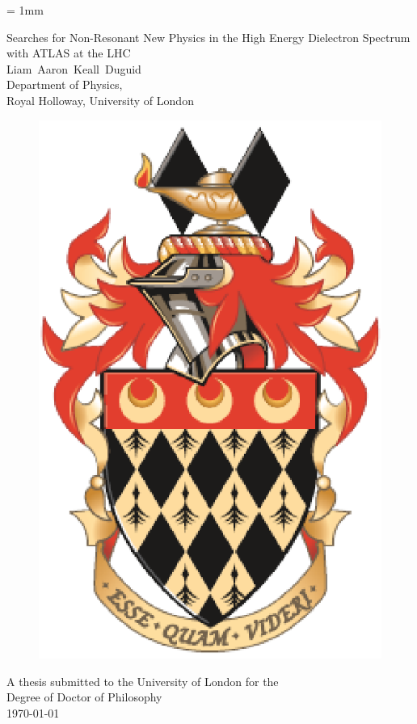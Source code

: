 \documentclass[12pt,a4paper]{report} %
\title{}
\author{}
\date{2014}
\begin{document}
\unitlength = 1mm
\begin{titlepage}

   \centering
   \vfill
   {\fontsize{0.75cm}{2cm}\selectfont Searches for Non-Resonant New Physics in the High Energy Dielectron Spectrum with ATLAS at the LHC}\\
   \vfill
   \vfill
   {
   {\Large Liam~Aaron~Keall~Duguid}\\ 
   \vfill
   {\large Department of Physics,\\
   Royal Holloway, University of London\\}
   }

   \vfill
   \vfill
   \begin{figure}[ht]
      \begin{center}
      \includegraphics[width=0.25\linewidth]{images/rhulcrestsmall.eps}
      \end{center}
   \end{figure}
   \vfill
   \vfill
   \vfill

   {A thesis submitted to the University of London for the\\
   Degree of Doctor of Philosophy}
   \\
   \vfill
   {\today\\}


\end{titlepage}
\end{document}
